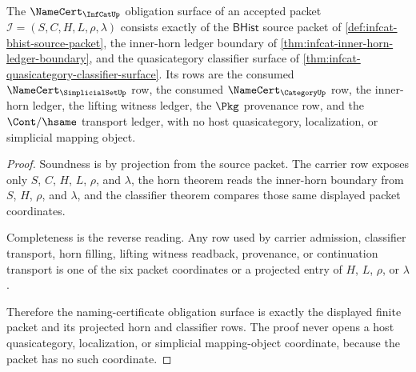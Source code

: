 \begin{theorem}
\label{thm:infcat-namecert-obligation-surface}
The $\NameCert_{\InfCatUp}$ obligation surface of an accepted packet
$\mathcal{I}=(S,C,H,L,\rho,\lambda)$ consists exactly of the
$\mathsf{BHist}$ source packet of
\autoref{def:infcat-bhist-source-packet}, the inner-horn ledger boundary of
\autoref{thm:infcat-inner-horn-ledger-boundary}, and the quasicategory
classifier surface of
\autoref{thm:infcat-quasicategory-classifier-surface}. Its rows are the
consumed $\NameCert_{\SimplicialSetUp}$ row, the consumed
$\NameCert_{\CategoryUp}$ row, the inner-horn ledger, the lifting witness
ledger, the $\Pkg$ provenance row, and the $\Cont/\hsame$ transport ledger,
with no host quasicategory, localization, or simplicial mapping object.
\end{theorem}
\begin{proof}
Soundness is by projection from the source packet. The carrier row exposes
only $S$, $C$, $H$, $L$, $\rho$, and $\lambda$, the horn theorem reads the
inner-horn boundary from $S$, $H$, $\rho$, and $\lambda$, and the classifier
theorem compares those same displayed packet coordinates.

Completeness is the reverse reading. Any row used by carrier admission,
classifier transport, horn filling, lifting witness readback, provenance, or
continuation transport is one of the six packet coordinates or a projected
entry of $H$, $L$, $\rho$, or $\lambda$.

Therefore the naming-certificate obligation surface is exactly the displayed
finite packet and its projected horn and classifier rows. The proof never
opens a host quasicategory, localization, or simplicial mapping-object
coordinate, because the packet has no such coordinate.
\end{proof}


